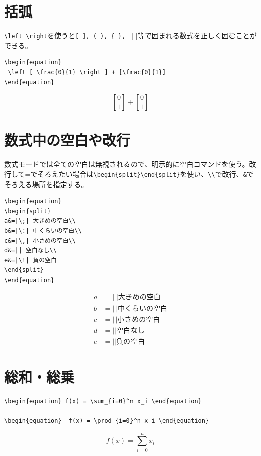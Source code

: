 \documentclass[a4j,openany,11px]{jsbook}
\begin{document}
\section{括弧}
\verb|\left \right|を使うと\verb|[ ], ( ), { }, | $|\;|$等で囲まれる数式を正しく囲むことができる。
\begin{verbatim}
\begin{equation}
 \left [ \frac{0}{1} \right ] + [\frac{0}{1}]
\end{equation}
\end{verbatim}
\begin{equation}\left [ \frac{0}{1} \right ] + [\frac{0}{1}]\end{equation}
\section{数式中の空白や改行}
数式モードでは全ての空白は無視されるので、明示的に空白コマンドを使う。改行して=でそろえたい場合は\verb|\begin{split}\end{split}|を使い、\verb|\\|で改行、\verb|&|でそろえる場所を指定する。
\begin{verbatim}
\begin{equation}
\begin{split}
a&=|\;| 大きめの空白\\
b&=|\:| 中くらいの空白\\
c&=|\,| 小さめの空白\\
d&=|| 空白なし\\
e&=|\!| 負の空白
\end{split}
\end{equation}
\end{verbatim}
\begin{equation}
\begin{split}
a&=|\;| 大きめの空白\\
b&=|\:| 中くらいの空白\\
c&=|\,| 小さめの空白\\
d&=|| 空白なし\\
e&=|\!| 負の空白
\end{split}
\end{equation}
\section{総和・総乗}
\begin{verbatim}
\begin{equation} f(x) = \sum_{i=0}^n x_i \end{equation}

\begin{equation}  f(x) = \prod_{i=0}^n x_i \end{equation}
\end{verbatim}
\begin{equation} f(x) = \sum_{i=0}^n x_i \end{equation}
\end{document}
